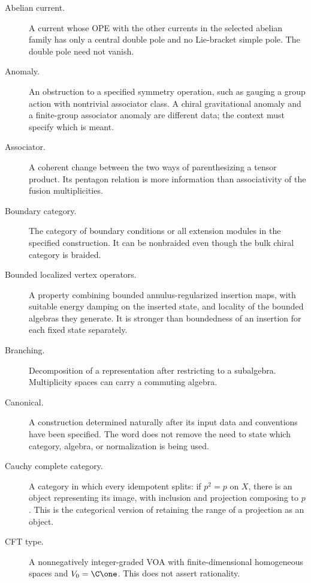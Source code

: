 \begin{description}
\item[Abelian current.]A current whose OPE with the other currents
in the selected abelian family has only a central double pole
and no Lie-bracket simple pole. The double pole need not vanish.

\item[Anomaly.]An obstruction to a specified symmetry operation,
such as gauging a group action with nontrivial associator class.
A chiral gravitational anomaly and a finite-group associator
anomaly are different data; the context must specify which is meant.

\item[Associator.]A coherent change between the two ways of
parenthesizing a tensor product. Its pentagon relation is more
information than associativity of the fusion multiplicities.

\item[Boundary category.]The category of boundary conditions or
all extension modules in the specified construction. It can be
nonbraided even though the bulk chiral category is braided.

\item[Bounded localized vertex operators.]A property combining
bounded annulus-regularized insertion maps, with suitable energy
damping on the inserted state, and locality of the bounded
algebras they generate. It is stronger than boundedness of an
insertion for each fixed state separately.

\item[Branching.]Decomposition of a representation after restricting
to a subalgebra. Multiplicity spaces can carry a commuting algebra.

\item[Canonical.]A construction determined naturally after its
input data and conventions have been specified. The word does not
remove the need to state which category, algebra, or normalization
is being used.

\item[Cauchy complete category.]A category in which every
idempotent splits: if $p^2=p$ on $X$, there is an object
representing its image, with inclusion and projection composing
to $p$. This is the categorical version of retaining the range
of a projection as an object.

\item[CFT type.]A nonnegatively integer-graded VOA with
finite-dimensional homogeneous spaces and
$V_0=\C\one$. This does not assert rationality.


\end{description}
